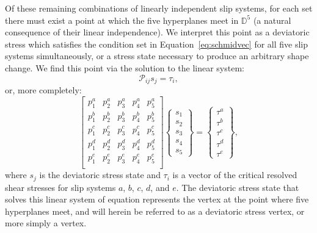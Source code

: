 \documentclass[preprint,3p,times,sort&compress,letterpaper,12pt]{elsarticle} %
\begin{document}
Of these remaining combinations of linearly independent slip systems, for each set there must exist a point at which the five hyperplanes meet in $\mathbb{D}^5$ (a natural consequence of their linear independence). We interpret this point as a deviatoric stress which satisfies the condition set in Equation~\ref{eq:schmidvec} for all five slip systems simultaneously, or a stress state necessary to produce an arbitrary shape change. We find this point via the solution to the linear system:
\begin{equation}
    \label{eq:linearsystem}
    \mathcal{P}_{ij} s_j = \tau_i, 
\end{equation}
or, more completely:
\begin{equation}
    \label{eq:linearsystemfull}
    \begin{bmatrix}
        p^a_1 & p^a_2 & p^a_3 & p^a_4 & p^a_5 \\
        p^b_1 & p^b_2 & p^b_3 & p^b_4 & p^b_5 \\
        p^c_1 & p^c_2 & p^c_3 & p^c_4 & p^c_5 \\
        p^d_1 & p^d_2 & p^d_3 & p^d_4 & p^d_5 \\
        p^e_1 & p^e_2 & p^e_3 & p^e_4 & p^e_5 \\
    \end{bmatrix}
    \begin{Bmatrix}
        s_1 \\
        s_2 \\
        s_3 \\
        s_4 \\
        s_5
    \end{Bmatrix}
    = 
    \begin{Bmatrix}
        \tau^a \\
        \tau^b \\
        \tau^c \\
        \tau^d \\
        \tau^e
    \end{Bmatrix},
\end{equation}
where $s_j$ is the deviatoric stress state and $\tau_i$ is a vector of the critical resolved shear stresses for slip systems $a$, $b$, $c$, $d$, and $e$. The deviatoric stress state that solves this linear system of equation represents the vertex at the point where five hyperplanes meet, and will herein be referred to as a deviatoric stress vertex, or more simply a vertex.
\end{document}
